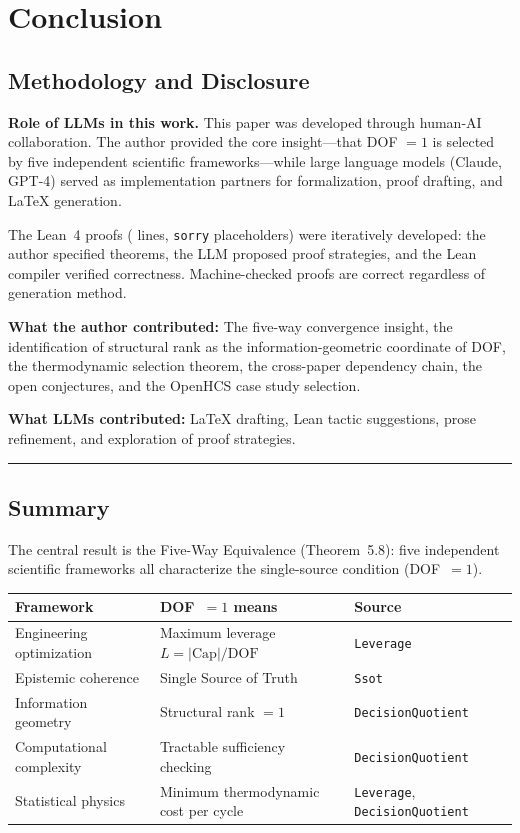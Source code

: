 \section{Conclusion}\label{conclusion}

\subsection{Methodology and Disclosure}

\textbf{Role of LLMs in this work.} This paper was developed through human-AI collaboration. The author provided the core insight---that DOF $= 1$ is selected by five independent scientific frameworks---while large language models (Claude, GPT-4) served as implementation partners for formalization, proof drafting, and \LaTeX{} generation.

The Lean~4 proofs (\LeanTotalLines{} lines, \LeanTotalSorry{} \texttt{sorry} placeholders) were iteratively developed: the author specified theorems, the LLM proposed proof strategies, and the Lean compiler verified correctness. Machine-checked proofs are correct regardless of generation method.

\textbf{What the author contributed:} The five-way convergence insight, the identification of structural rank as the information-geometric coordinate of DOF, the thermodynamic selection theorem, the cross-paper dependency chain, the open conjectures, and the OpenHCS case study selection.

\textbf{What LLMs contributed:} \LaTeX{} drafting, Lean tactic suggestions, prose refinement, and exploration of proof strategies.

\begin{center}\rule{0.5\linewidth}{0.5pt}\end{center}

\subsection{Summary}

The central result is the Five-Way Equivalence (Theorem~5.8): five independent scientific frameworks all characterize the single-source condition (DOF~$= 1$).

\begin{center}
\begin{tabular}{lll}
\hline
\textbf{Framework} & \textbf{DOF~$= 1$ means} & \textbf{Source} \\
\hline
Engineering optimization & Maximum leverage $L = |\mathrm{Cap}|/\mathrm{DOF}$ & \nolinkurl{Leverage} \\
Epistemic coherence & Single Source of Truth & \nolinkurl{Ssot} \\
Information geometry & Structural rank $= 1$ & \nolinkurl{DecisionQuotient} \\
Computational complexity & Tractable sufficiency checking & \nolinkurl{DecisionQuotient} \\
Statistical physics & Minimum thermodynamic cost per cycle & \nolinkurl{Leverage}, \nolinkurl{DecisionQuotient} \\
\hline
\end{tabular}
\end{center}

